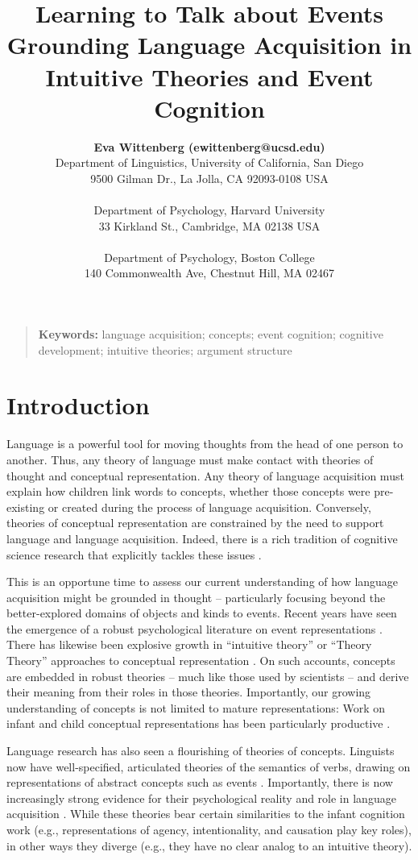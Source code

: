 \documentclass[10pt,letterpaper]{article}
\title{Learning to Talk about Events\\ Grounding Language Acquisition in Intuitive Theories and Event Cognition} %
\author{{\large \bf Eva Wittenberg (ewittenberg@ucsd.edu)} \\
  Department of Linguistics,
  University of California, San Diego \\
  9500 Gilman Dr.,
  La Jolla, CA 92093-0108 USA \\
  \AND {\large \bf Melissa Kline (mekline@mit.edu)} \\
  Department of Psychology,
  Harvard University \\
  33 Kirkland St.,
  Cambridge, MA 02138 USA \\
  \AND {\large \bf Joshua K. Hartshorne (joshua.hartshorne@bc.edu)} \\
  Department of Psychology,
  Boston College \\
  140 Commonwealth Ave,
  Chestnut Hill, MA 02467}
\begin{document}
\maketitle

\begin{quote}
\small
\textbf{Keywords:}
language acquisition; concepts; event cognition; cognitive
development; intuitive theories; argument structure
\end{quote}

\section{Introduction}

Language is a powerful tool for moving thoughts from the
head of one person to another. Thus, any theory of language must make
contact with theories of thought and conceptual representation. Any
theory of language acquisition must explain how children link words to
concepts, whether those concepts were pre-existing or created during
the process of language acquisition. Conversely, theories of
conceptual representation are constrained by the need to support
language and language acquisition. Indeed, there is a rich tradition
of cognitive science research that explicitly tackles these issues \cite{Clark2004,Bowerman1989}.

This is an opportune time to assess our
current understanding of how language acquisition might be grounded in
thought -- particularly focusing beyond the better-explored domains of
objects and kinds to events. Recent years have seen the emergence of a
robust psychological literature on event representations \cite{Tversky2013}. There has
likewise been explosive growth in
``intuitive theory'' or ``Theory Theory'' approaches to conceptual representation
\cite{Gopnikinpress,HOT2015,Goodman2011,Battaglia2013}. On such accounts, concepts are
embedded in robust theories -- much like those used by
scientists -- and derive their meaning from their roles in those
theories. Importantly, our growing understanding of concepts
is not limited to mature representations: Work on infant and child
conceptual representations has been particularly productive \cite{Gopnikinpress,Ettinger,Henrik2015}.

Language research has also seen a flourishing of theories of
concepts. Linguists now have well-specified, articulated theories of
the semantics of verbs, drawing on representations of abstract
concepts such as events \cite{Levin2011,Levin2005}. Importantly, there is now increasingly strong evidence for their psychological reality and role in language acquisition
\cite{Ambridge2013,HOSULS}. While these theories bear certain
similarities to the infant cognition work (e.g., representations of
agency, intentionality, and causation play key roles), in other ways
they diverge (e.g., they have no clear analog to an intuitive theory).
\end{document}
